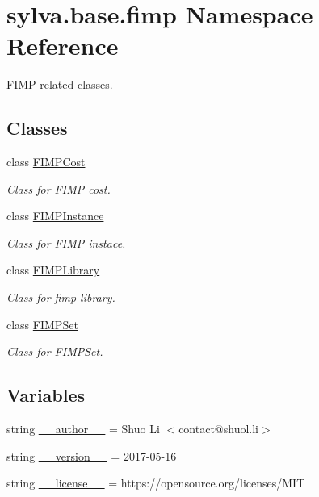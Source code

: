 \hypertarget{namespacesylva_1_1base_1_1fimp}{}\section{sylva.\+base.\+fimp Namespace Reference}
\label{namespacesylva_1_1base_1_1fimp}


F\+I\+MP related classes.  


\subsection*{Classes}
\begin{DoxyCompactItemize}
\item 
class \hyperlink{classsylva_1_1base_1_1fimp_1_1_f_i_m_p_cost}{F\+I\+M\+P\+Cost}
\begin{DoxyCompactList}\small\item\em Class for F\+I\+MP cost. \end{DoxyCompactList}\item 
class \hyperlink{classsylva_1_1base_1_1fimp_1_1_f_i_m_p_instance}{F\+I\+M\+P\+Instance}
\begin{DoxyCompactList}\small\item\em Class for F\+I\+MP instace. \end{DoxyCompactList}\item 
class \hyperlink{classsylva_1_1base_1_1fimp_1_1_f_i_m_p_library}{F\+I\+M\+P\+Library}
\begin{DoxyCompactList}\small\item\em Class for fimp library. \end{DoxyCompactList}\item 
class \hyperlink{classsylva_1_1base_1_1fimp_1_1_f_i_m_p_set}{F\+I\+M\+P\+Set}
\begin{DoxyCompactList}\small\item\em Class for \hyperlink{classsylva_1_1base_1_1fimp_1_1_f_i_m_p_set}{F\+I\+M\+P\+Set}. \end{DoxyCompactList}\end{DoxyCompactItemize}
\subsection*{Variables}
\begin{DoxyCompactItemize}
\item 
string \hyperlink{namespacesylva_1_1base_1_1fimp_a7b088b79551408deecce8bde1a7bfd5b}{\+\_\+\+\_\+author\+\_\+\+\_\+} = \textquotesingle{}Shuo Li $<$contact@shuol.\+li$>$\textquotesingle{}
\item 
string \hyperlink{namespacesylva_1_1base_1_1fimp_a29c6dd0c9261d67c1e7fbbfe588f9156}{\+\_\+\+\_\+version\+\_\+\+\_\+} = \textquotesingle{}2017-\/05-\/16\textquotesingle{}
\item 
string \hyperlink{namespacesylva_1_1base_1_1fimp_a09f8f985a5f4c7a9aed068a07667cab5}{\+\_\+\+\_\+license\+\_\+\+\_\+} = \textquotesingle{}https\+://opensource.\+org/licenses/M\+IT\textquotesingle{}
\end{DoxyCompactItemize}



